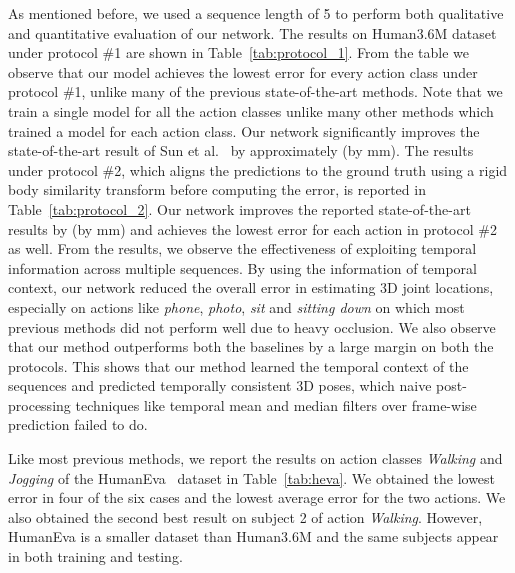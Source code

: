 \documentclass[runningheads]{llncs}
\begin{document}
As mentioned before, we used a sequence length of 5 to perform both qualitative and quantitative evaluation of our network. The results on Human3.6M dataset~\cite{h36m_pami} under protocol \#1 are shown in Table~\ref{tab:protocol_1}. From the table we observe that our model achieves the lowest error for every action class under protocol \#1, unlike many of the previous state-of-the-art methods. Note that we train a single model for all the action classes unlike many other methods which trained a model for each action class.  Our network significantly improves the state-of-the-art result of Sun et al.~\cite{sun2017compositional} by approximately  (by  mm). The results under  protocol \#2, which aligns the predictions to the ground truth using a rigid body similarity transform before computing the error, is reported in Table~\ref{tab:protocol_2}. Our network improves the reported state-of-the-art results by  (by  mm) and achieves the lowest error for each action in protocol \#2  as well. From the results, we observe the effectiveness of exploiting temporal information across multiple sequences. By using the information of temporal context, our network reduced the overall error in estimating 3D joint locations, especially on actions like  \emph{phone},  \emph{photo}, \emph{sit} and \emph{sitting down} on which most previous methods did not perform well due to heavy occlusion. We also observe that our method outperforms both the baselines by a large margin on both the protocols. This shows that our method learned the temporal context of the sequences and predicted temporally consistent 3D poses, which naive post-processing techniques like temporal mean and median filters over frame-wise prediction failed to do. 

Like most previous methods, we report the results on action classes \emph{Walking} and \emph{Jogging} of the HumanEva~\cite{heva} dataset in Table~\ref{tab:heva}. We obtained the lowest error in four of the six cases and the lowest average error for the two actions. We also obtained the second best result on subject 2 of action \emph{Walking}. However, HumanEva is a smaller dataset than Human3.6M and the same subjects appear in both training and testing.
\end{document}
